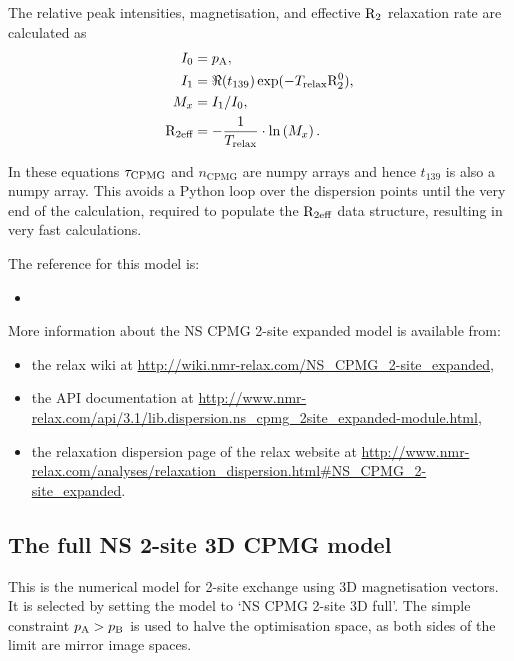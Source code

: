 The relative peak intensities, magnetisation, and effective $\mathrm{R}_2$ relaxation rate are calculated as
\begin{subequations}
\begin{align}
    I_0 &= p_\textrm{A}, \\
    I_1 &= \Re(t_{139}) \exp(-T_\textrm{relax} \mathrm{R}_2^0), \\
    M_x &= I_1 / I_0, \\
    \mathrm{R}_\textrm{2eff} &= -\frac{1}{T_\textrm{relax}} \cdot \ln \left( M_x \right). \label{eq: R2eff NS CPMG 2-site expanded}
\end{align}
\end{subequations}

In these equations $\tau_\textrm{CPMG}$ and $n_\textrm{CPMG}$ are numpy arrays and hence $t_{139}$ is also a numpy array.
This avoids a Python loop over the dispersion points until the very end of the calculation, required to populate the $\mathrm{R}_\textrm{2eff}$ data structure, resulting in very fast calculations.

The reference for this model is:
\begin{itemize}
  \item {}
\end{itemize}

More information about the NS CPMG 2-site expanded model is available from:
\begin{itemize}
  \item the relax wiki at \url{http://wiki.nmr-relax.com/NS\_CPMG\_2-site\_expanded},
  \item the API documentation at \url{http://www.nmr-relax.com/api/3.1/lib.dispersion.ns\_cpmg\_2site\_expanded-module.html},
  \item the relaxation dispersion page of the relax website at \url{http://www.nmr-relax.com/analyses/relaxation\_dispersion.html#NS\_CPMG\_2-site\_expanded}.
\end{itemize}



\subsection{The full NS 2-site 3D CPMG model}
\label{sect: dispersion: NS CPMG 2-site 3D full model}

This is the numerical model for 2-site exchange using 3D magnetisation vectors.
It is selected by setting the model to `NS CPMG 2-site 3D full'.
The simple constraint $p_\textrm{A} > p_\textrm{B}$ is used to halve the optimisation space, as both sides of the limit are mirror image spaces.

